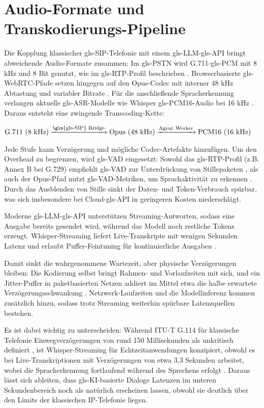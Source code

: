 \vspace{1em}

\section{Audio-Formate und Transkodierungs-Pipeline}
Die Kopplung klassischer \gls{gls-SIP}-Telefonie mit einem \gls{gls-LLM}-\gls{gls-API} bringt abweichende Audio-Formate zusammen: Im \gls{gls-PSTN} wird G.711-\gls{gls-PCM} mit 8 kHz und 8 Bit genutzt, wie im \gls{gls-RTP}-Profil beschrieben \parencite{rfc3551,ITU-T-G114}. Browserbasierte \gls{gls-WebRTC}-Pfade setzen hingegen auf den Opus-Codec mit interner 48 kHz Abtastung und variabler Bitrate \parencite{rfc6716}. Für die anschlie\ss ende Spracherkennung verlangen aktuelle \gls{gls-ASR}-Modelle wie Whisper \gls{gls-PCM16}-Audio bei 16 kHz \parencite{whisper_quant_2025}. Daraus entsteht eine zwingende Transcoding-Kette:

$\text{G.711 (8 kHz)} \xrightarrow{\text{\gls{gls-SIP} Bridge}} \text{Opus (48 kHz)} \xrightarrow{\text{Agent Worker}} \text{PCM16 (16 kHz)}$

Jede Stufe kann Verzögerung und mögliche Codec-Artefakte hinzufügen. Um den Overhead zu begrenzen, wird \gls{gls-VAD} eingesetzt: Sowohl das \gls{gls-RTP}-Profil (z.B. Annex B bei G.729) empfiehlt \gls{gls-VAD} zur Unterdrückung von Stillepaketen \parencite{rfc3551}, als auch der Opus-Pfad nutzt \gls{gls-VAD}-Metriken, um Sprachaktivität zu erkennen \parencite{rfc6716}. Durch das Ausblenden von Stille sinkt der Daten- und Token-Verbrauch spürbar, was sich insbesondere bei Cloud-\gls{gls-API} in geringeren Kosten niederschlägt.

Moderne \gls{gls-LLM}-\gls{gls-API} unterstützen Streaming-Antworten, sodass eine Ausgabe bereits gesendet wird, während das Modell noch restliche Tokens erzeugt. Whisper-Streaming liefert Live-Transkripte mit wenigen Sekunden Latenz und erlaubt Puffer-Feintuning für kontinuierliche Ausgaben \parencite{whisper_quant_2025}.

Damit sinkt die wahrgenommene Wartezeit, aber physische Verzögerungen bleiben: Die Kodierung selbst bringt Rahmen- und Vorlaufzeiten mit sich, und ein Jitter-Puffer in paketbasierten Netzen addiert im Mittel etwa die halbe erwartete Verzögerungsschwankung \parencite{rfc3550,ITU-T-G114}. Netzwerk-Laufzeiten und die Modellinferenz kommen zusätzlich hinzu, sodass trotz Streaming weiterhin spürbare Latenzquellen bestehen.

Es ist dabei wichtig zu unterscheiden: Während ITU-T G.114 für klassische Telefonie Einwegverzögerungen von rund 150 Millisekunden als unkritisch definiert \parencite{ITU-T-G114}, ist Whisper-Streaming für Echtzeitanwendungen konzipiert, obwohl es bei Live-Transkriptionen mit Verzögerungen von etwa 3,3 Sekunden arbeitet, wobei die Spracherkennung fortlaufend während des Sprechens erfolgt \parencite{whisper_quant_2025}. Daraus lässt sich ableiten, dass \gls{gls-KI}-basierte Dialoge Latenzen im unteren Sekundenbereich noch als natürlich erscheinen lassen, obwohl sie deutlich über den Limits der klassischen IP-Telefonie liegen.

